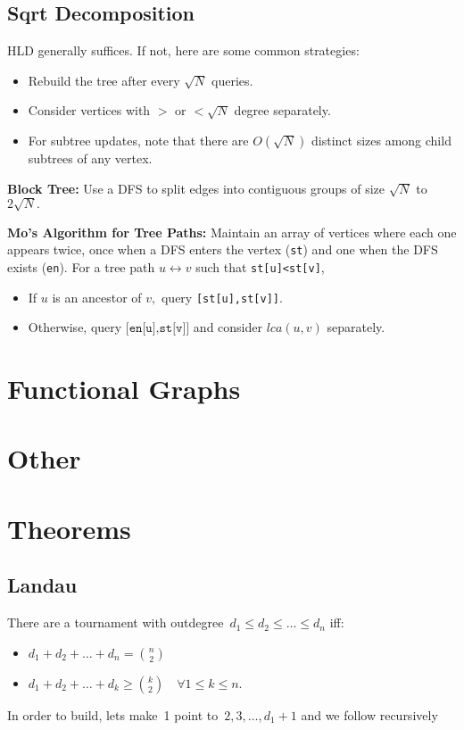     \subsection{Sqrt Decomposition}
		HLD generally suffices. If not, here are some common strategies:
		\begin{itemize}
			\item Rebuild the tree after every $\sqrt N$ queries. 
			\item Consider vertices with $>$ or $<\sqrt N$ degree separately. 
			\item For subtree updates, note that there are $O(\sqrt N)$ distinct sizes among child subtrees of any vertex.
		\end{itemize}

		\textbf{Block Tree:} Use a DFS to split edges into contiguous groups of size $\sqrt N$ to $2\sqrt N.$

		\textbf{Mo's Algorithm for Tree Paths:} Maintain an array of vertices where each one appears twice, once when a DFS enters the vertex (\texttt{st}) and one when the DFS exists (\texttt{en}). For a tree path $u\leftrightarrow v$ such that \texttt{st[u]<st[v]},

		\begin{itemize}
		\item If $u$ is an ancestor of $v,$ query \texttt{[st[u],st[v]]}.
		\item Otherwise, query $\texttt{[en[u],st[v]]}$ and consider $lca(u,v)$ separately.
		\end{itemize}
    
\section{Functional Graphs}
\section{Other}

\section{Theorems}

\subsection{Landau}
There are a tournament with outdegree~$d_1 \leq d_2 \leq \ldots \leq d_n$ iff:
\begin{itemize}
\item $d_1 + d_2 + \ldots + d_n = {n \choose 2}$\newline
\item $d_1 + d_2 + \ldots + d_k \geq {k \choose 2} \quad \forall 1 \leq k \leq n.$
\end{itemize}
In order to build, lets make~1 point to~$2, 3, \ldots, d_1 + 1$ and we follow recursively

